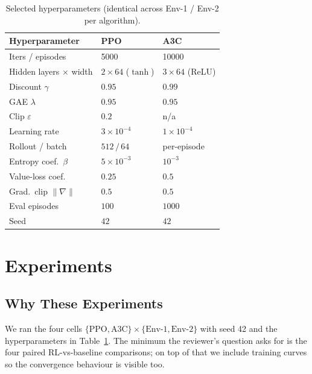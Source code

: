 \documentclass[letterpaper]{article} %
\begin{document}
\begin{table}[t]
\centering
\caption{Selected hyperparameters (identical across Env-1 /
Env-2 per algorithm).}
\label{tab:hparams}
\small
\begin{tabular}{@{}lll@{}}
\toprule
\textbf{Hyperparameter}       & \textbf{PPO}              & \textbf{A3C}              \\
\midrule
Iters / episodes              & \num{5000}                & \num{10000}               \\
Hidden layers $\times$ width  & $2\times 64$ ($\tanh$)    & $3\times 64$ (ReLU)       \\
Discount $\gamma$             & $0.95$                    & $0.99$                    \\
GAE $\lambda$                 & $0.95$                    & $0.95$                    \\
Clip $\varepsilon$            & $0.2$                     & n/a                       \\
Learning rate                 & $3{\times}10^{-4}$        & $1{\times}10^{-4}$        \\
Rollout / batch               & $512\,/\,64$              & per-episode               \\
Entropy coef.\ $\beta$        & $5{\times}10^{-3}$        & $10^{-3}$                 \\
Value-loss coef.              & $0.25$                    & $0.5$                     \\
Grad.\ clip $\|\nabla\|$      & $0.5$                     & $0.5$                     \\
Eval episodes                 & $100$                     & $1000$                    \\
Seed                          & $42$                      & $42$                      \\
\bottomrule
\end{tabular}
\end{table}

\section{Experiments}
\label{sec:exp}

\subsection{Why These Experiments}
We ran the four cells
$\{\mathrm{PPO},\mathrm{A3C}\}\times\{\text{Env-1},\text{Env-2}\}$
with seed 42 and the hyperparameters in
Table~\ref{tab:hparams}.  The minimum the reviewer's question
asks for is the four paired RL-vs-baseline comparisons; on top of
that we include training curves so the convergence behaviour is
visible too.
\end{document}
